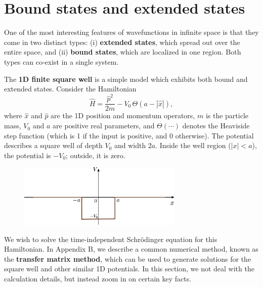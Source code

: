 \documentclass[pra,12pt]{revtex4}
\begin{document}
\section{Bound states and extended states}

One of the most interesting features of wavefunctions in infinite
space is that they come in two distinct types: (i) \textbf{extended
  states}, which spread out over the entire space, and (ii)
\textbf{bound states}, which are localized in one region.  Both types
can co-exist in a single system.

The \textbf{1D finite square well} is a simple model which exhibits
both bound and extended states.  Consider the Hamiltonian
$$\hat{H} = \frac{\hat{p}^2}{2m} - V_0 \,\Theta(a -|\hat{x}|),$$ where
$\hat{x}$ and $\hat{p}$ are the 1D position and momentum operators,
$m$ is the particle mass, $V_0$ and $a$ are positive real parameters,
and $\Theta(\cdots)$ denotes the Heaviside step function (which is 1
if the input is positive, and 0 otherwise).  The potential describes a
square well of depth $V_0$ and width $2a$.  Inside the well region
($|x| < a$), the potential is $-V_0$; outside, it is zero.

\begin{figure}[h]
  \centering\includegraphics[width=0.7\textwidth]{squarewell}
\end{figure}

We wish to solve the time-independent Schr\"odinger equation for this
Hamiltonian.  In Appendix B, we describe a common numerical method,
known as the \textbf{transfer matrix method}, which can be used to
generate solutions for the square well and other similar 1D
potentials.  In this section, we not deal with the calculation
details, but instead zoom in on certain key facts.
\end{document}

